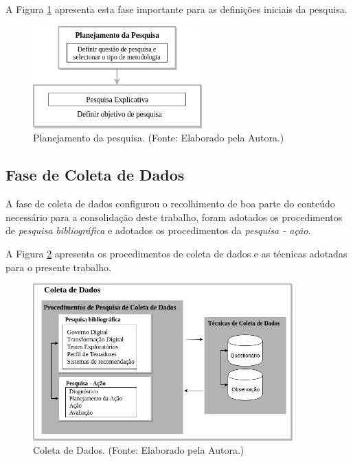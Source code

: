 A Figura \ref{fig:PlanPesquisa} apresenta esta fase importante para as definições iniciais da pesquisa. 

        \begin{figure}[H]
          \centering
          \includegraphics[width=6.5cm]{figuras/planejamentoPesquisa.png}
          \caption{Planejamento da pesquisa. (Fonte: Elaborado pela Autora.)} 
          \label{fig:PlanPesquisa}
        
        \end{figure}


        

\subsection{Fase de Coleta de Dados}

A fase de coleta de dados configurou o recolhimento de boa parte do conteúdo necessário para a consolidação deste trabalho, foram adotados os procedimentos de \textit{pesquisa bibliográfica} e adotados os procedimentos da \textit{pesquisa - ação}.

A Figura \ref{fig:coletaDados} apresenta os procedimentos de coleta de dados e as técnicas adotadas para o presente trabalho.

        \begin{figure}[H]
          \centering
          \includegraphics[width=10cm]{figuras/coletadeDados.png}
          \caption{Coleta de Dados. (Fonte: Elaborado pela Autora.)} 
          \label{fig:coletaDados}
        
        \end{figure}

